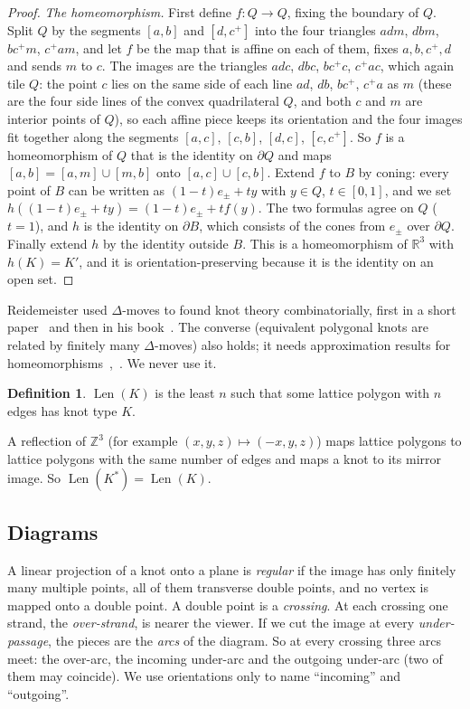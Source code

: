 \documentclass[11pt]{article}
\theoremstyle{plain}
\theoremstyle{definition}
\newtheorem{definition}[theorem]{Definition}
\theoremstyle{remark}
\newcommand{\Len}{\operatorname{Len}}
\newcommand{\Z}{\mathbb{Z}}
\newcommand{\R}{\mathbb{R}}
\begin{document}
\begin{proof}
\emph{The homeomorphism.} First define $f:Q\to Q$, fixing the boundary of $Q$. Split $Q$ by the
segments $[a,b]$ and $[d,c^+]$ into the four triangles $adm$, $dbm$, $bc^+m$, $c^+am$, and let $f$ be
the map that is affine on each of them, fixes $a,b,c^+,d$ and sends $m$ to $c$. The images are the
triangles $adc$, $dbc$, $bc^+c$, $c^+ac$, which again tile $Q$: the point $c$ lies on the same side of each
line $ad$, $db$, $bc^+$, $c^+a$ as $m$ (these are the four side lines of the convex quadrilateral $Q$,
and both $c$ and $m$ are interior points of $Q$), so each affine piece keeps its orientation and the four images fit together
along the segments $[a,c]$, $[c,b]$, $[d,c]$, $[c,c^+]$. So $f$ is a homeomorphism of $Q$ that is the
identity on $\partial Q$ and maps $[a,b]=[a,m]\cup[m,b]$ onto $[a,c]\cup[c,b]$. Extend $f$ to $B$ by
coning: every point of $B$ can be written as $(1-t)e_\pm+ty$ with $y\in Q$, $t\in[0,1]$, and we set
$h((1-t)e_\pm+ty)=(1-t)e_\pm+tf(y)$. The two formulas agree on $Q$ ($t=1$), and $h$ is the identity on
$\partial B$, which consists of the cones from $e_\pm$ over $\partial Q$. Finally extend $h$ by the
identity outside $B$. This is a homeomorphism of $\R^3$ with $h(K)=K'$, and it is
orientation-preserving because it is the identity on an open set.
\end{proof}

Reidemeister used $\Delta$-moves to found knot theory combinatorially, first in a short paper~\cite{Rei27} and then in his book~\cite{Rei32}. The converse
(equivalent polygonal knots are related by finitely many $\Delta$-moves) also holds; it needs
approximation results for homeomorphisms~\cite[Ch.~1]{BZ},~\cite[Chs.~33--36]{Moi77}. We never use it.

\begin{definition}
$\Len(K)$ is the least $n$ such that some lattice polygon with $n$ edges has knot type $K$.
\end{definition}

A reflection of $\Z^3$ (for example $(x,y,z)\mapsto(-x,y,z)$) maps lattice polygons to lattice
polygons with the same number of edges and maps a knot to its mirror image. So $\Len(K^*)=\Len(K)$.

\subsection{Diagrams}\label{sec:diagrams}

A linear projection of a knot onto a plane is \emph{regular} if the image has only finitely many
multiple points, all of them transverse double points, and no vertex is mapped onto a double point.
A double point is a \emph{crossing}. At each crossing one strand, the \emph{over-strand}, is nearer the
viewer. If we cut the image at every \emph{under-passage}, the pieces are the \emph{arcs} of the
diagram. So at every crossing three arcs meet: the over-arc, the incoming under-arc and the outgoing
under-arc (two of them may coincide). We use orientations only to name ``incoming'' and ``outgoing''.
\end{document}
